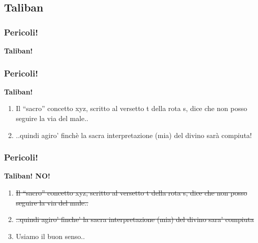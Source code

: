 \documentclass{beamer}
\begin{document}
\subsection{Taliban}
\begin{frame}
	\frametitle{Pericoli!}
	\begin{center}
		\textbf{Taliban!}
	\end{center}
	\begin{center}
	\end{center}
\end{frame}

\begin{frame}
	\frametitle{Pericoli!}
	\begin{center}
		\textbf{Taliban!}
	\end{center}
	\begin{enumerate}
  		\item<1-> Il ``sacro'' concetto xyz, scritto al versetto t della rota s, dice che non posso seguire la via del male..
  		\item<2-> ..quindi agiro' finchè la sacra interpretazione (mia) del divino sarà compiuta!
	\end{enumerate}
\end{frame}

\begin{frame}
	\frametitle{Pericoli!}
	\begin{center}
		\textbf{Taliban! NO!}
	\end{center}
	\begin{enumerate}
  		\item \st{Il ``sacro'' concetto xyz, scritto al versetto t della rota s, dice che non posso seguire la via del male..}
  		\item \st{..quindi agiro' finche' la sacra interpretazione (mia) del divino sara' compiuta}
  		\item Usiamo il buon senso..
	\end{enumerate}
\end{frame}
\end{document}
